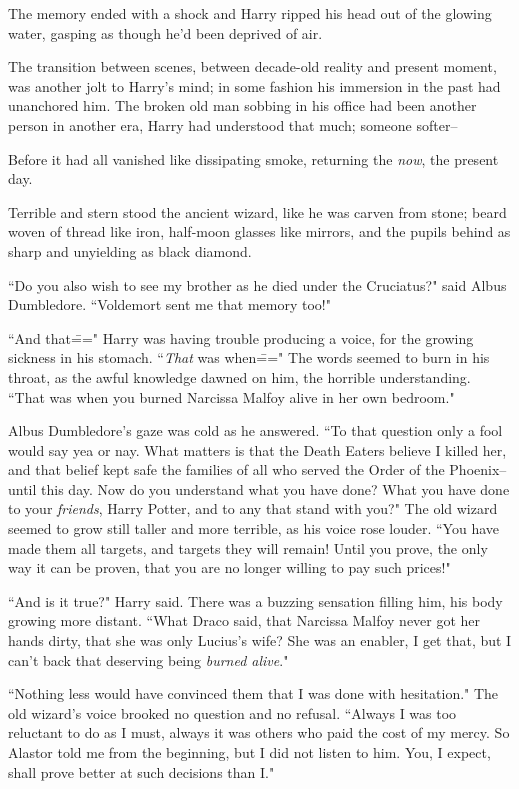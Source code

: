 \later

The memory ended with a shock and Harry ripped his head out of the glowing water, gasping as though he'd been deprived of air.

The transition between scenes, between decade-old reality and present moment, was another jolt to Harry's mind; in some fashion his immersion in the past had unanchored him. The broken old man sobbing in his office had been another person in another era, Harry had understood that much; someone softer\---

Before it had all vanished like dissipating smoke, returning the \emph{now}, the present day.

Terrible and stern stood the ancient wizard, like he was carven from stone; beard woven of thread like iron, half-moon glasses like mirrors, and the pupils behind as sharp and unyielding as black diamond.

``Do you also wish to see my brother as he died under the Cruciatus?" said Albus Dumbledore. ``Voldemort sent me that memory too!"

``And that\===" Harry was having trouble producing a voice, for the growing sickness in his stomach. ``\emph{That} was when\===" The words seemed to burn in his throat, as the awful knowledge dawned on him, the horrible understanding. ``That was when you burned Narcissa Malfoy alive in her own bedroom."

Albus Dumbledore's gaze was cold as he answered. ``To that question only a fool would say yea or nay. What matters is that the Death Eaters believe I killed her, and that belief kept safe the families of all who served the Order of the Phoenix\---until this day. Now do you understand what you have done? What you have done to your \emph{friends}, Harry Potter, and to any that stand with you?" The old wizard seemed to grow still taller and more terrible, as his voice rose louder. ``You have made them all targets, and targets they will remain! Until you prove, the only way it can be proven, that you are no longer willing to pay such prices!"

``And is it true?" Harry said. There was a buzzing sensation filling him, his body growing more distant. ``What Draco said, that Narcissa Malfoy never got her hands dirty, that she was only Lucius's wife? She was an enabler, I get that, but I can't back that deserving being \emph{burned alive}."

``Nothing less would have convinced them that I was done with hesitation." The old wizard's voice brooked no question and no refusal. ``Always I was too reluctant to do as I must, always it was others who paid the cost of my mercy. So Alastor told me from the beginning, but I did not listen to him. You, I expect, shall prove better at such decisions than I."

